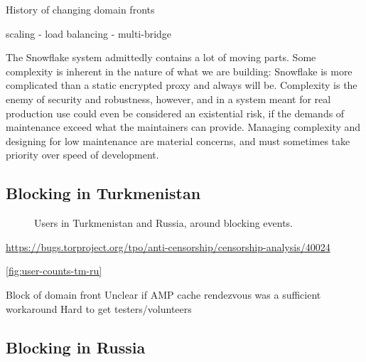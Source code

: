 \documentclass[letterpaper,twocolumn]{article}
\begin{document}
History of changing domain fronts

scaling
- load balancing
- multi-bridge

The Snowflake system
admittedly contains a lot of moving parts.
Some complexity is inherent in the nature
of what we are building:
Snowflake is more complicated than a static encrypted proxy
and always will be.
Complexity is the enemy of security and robustness, however,
and in a system meant for real production use
could even be considered an existential risk,
if the demands of maintenance exceed what the maintainers can provide.
Managing complexity and designing for low maintenance
are material concerns,
and must sometimes take priority over speed of development.



\subsection{Blocking in Turkmenistan}
\label{sec:block-tm}

\begin{figure}
\caption{
Users in Turkmenistan and Russia,
around blocking events.
}
\label{fig:user-counts-tm-ru}
\end{figure}


\url{https://bugs.torproject.org/tpo/anti-censorship/censorship-analysis/40024}

\autoref{fig:user-counts-tm-ru}

Block of domain front
Unclear if AMP cache rendezvous was a sufficient workaround
Hard to get testers/volunteers

\subsection{Blocking in Russia}
\label{sec:block-ru}

\end{document}
